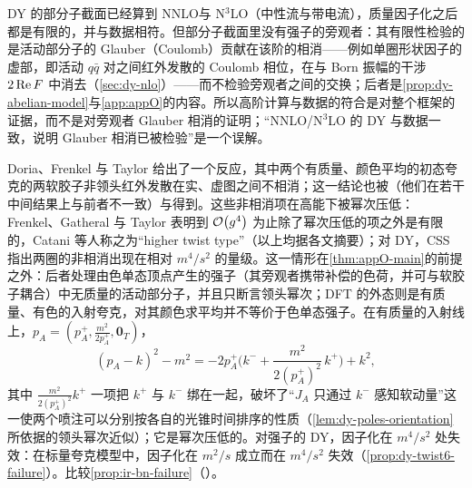 \begin{remark}\label{rem:dy-nnlo-not-glauber}
DY 的部分子截面已经算到 NNLO\cite{HambergVanNeervenMatsuura1991}与 N$^3$LO（中性流\cite{Duhr:2020seh}与带电流\cite{Duhr:2020sdp}），质量因子化之后都是有限的，并与数据相符。但部分子截面里没有强子的旁观者：其有限性检验的是活动部分子的 Glauber（Coulomb）贡献在该阶的相消——例如单圈形状因子的虚部，即活动 $q\bar q$ 对之间红外发散的 Coulomb 相位，在与 Born 振幅的干涉 $2\operatorname{Re} F$ 中消去（\cref{sec:dy-nlo}）——而不检验旁观者之间的交换；后者是\cref{prop:dy-abelian-model}与\cref{app:appO}的内容。所以高阶计算与数据的符合是对整个框架的证据，而不是对旁观者 Glauber 相消的证明；“NNLO/N$^3$LO 的 DY 与数据一致，说明 Glauber 相消已被检验”是一个误解。
\end{remark}

\begin{remark}\label{rem:dy-dft-premises}
Doria、Frenkel 与 Taylor 给出了一个反应，其中两个有质量、颜色平均的初态夸克的两软胶子非领头红外发散在实、虚图之间不相消\cite{DoriaFrenkelTaylor1980}；这一结论也被\cite{DiLietoEtAl1981}（他们在若干中间结果上与前者不一致）与\cite{Andrasi:1980qw}得到。这些非相消项在高能下被幂次压低：Frenkel、Gatheral 与 Taylor 表明到 $\mathcal{O}\!\left(g^4\right)$ 为止除了幂次压低的项之外是有限的\cite{Frenkel:1983di}，Catani 等人称之为“higher twist type”\cite{Catani:1985xt}（以上均据各文摘要）；对 DY，CSS 指出两圈的非相消出现在相对 $m^4/s^2$ 的量级\cite[第~10.2~节]{CollinsSoperSterman1989}。这一情形在\cref{thm:appO-main}的前提之外：后者处理由色单态顶点产生的强子（其旁观者携带补偿的色荷，并可与软胶子耦合）中无质量的活动部分子，并且只断言领头幂次；DFT 的外态则是有质量、有色的入射夸克，对其颜色求平均并不等价于色单态强子。在有质量的入射线上，$p_A=(p_A^+,\frac{m^2}{2p_A^+},\mathbf 0_T)$，
\begin{equation}\label{eq:dy-dft}
(p_A-k)^2-m^2=-2p_A^+\Big(k^-+\frac{m^2}{2(p_A^+)^2}\,k^+\Big)+k^2 ,
\end{equation}
其中 $\frac{m^2}{2(p_A^+)^2}k^+$ 一项把 $k^+$ 与 $k^-$ 绑在一起，破坏了“$J_A$ 只通过 $k^-$ 感知软动量”这一使两个喷注可以分别按各自的光锥时间排序的性质（\cref{lem:dy-poles-orientation}所依据的领头幂次近似）；它是幂次压低的。对强子的 DY，因子化在 $m^4/s^2$ 处失效：在标量夸克模型中，因子化在 $m^2/s$ 成立而在 $m^4/s^2$ 失效\cite{Basu:1984ba}（\cref{prop:dy-twist6-failure}）。比较\cref{prop:ir-bn-failure}（\tagV）。
\end{remark}

